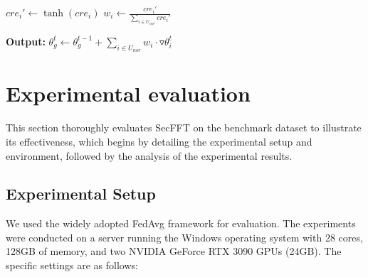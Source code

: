 \documentclass[lettersize,journal]{IEEEtran}
\begin{document}
\begin{algorithm}
\begin{algorithmic}[1]
        \State $cre_i'  \gets \tanh(cre_i)$
        \State $w_i  \gets \frac{cre_i'}{\sum_{i \in U_{nor}} cre_i'}$
\EndFor

\State \textbf{Output:} $\theta_g^t \gets \theta_g^{t-1} + \sum_{i \in U_{nor}} w_i \cdot \triangledown \theta_i^t$
\end{algorithmic}
\end{algorithm}







\section{Experimental evaluation}
This section thoroughly evaluates SecFFT on the benchmark dataset to illustrate its effectiveness, which begins by detailing the experimental setup and environment, followed by the analysis of the experimental results.

\subsection{Experimental Setup}
We used the widely adopted FedAvg framework for evaluation. The experiments were conducted on a server running the Windows operating system with 28 cores, 128GB of memory, and two NVIDIA GeForce RTX 3090 GPUs (24GB). The specific settings are as follows:
\end{document}
